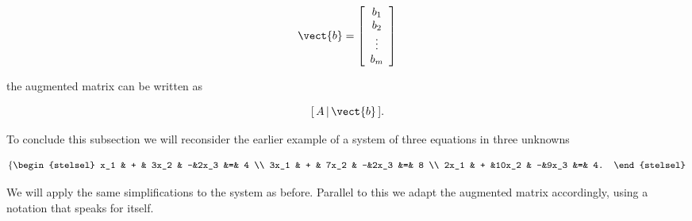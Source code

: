 $$

  \vect{b} =  \left[
\begin{array}{c}
                b_1\\b_2\\\vdots\\b_m
          \end{array}
   \right]
$$

the augmented matrix can be written as

$$

  [\,A\,|\,\vect{b}\,].
$$


\medskip

To conclude this subsection we will reconsider the earlier example of a system of three equations in three unknowns

$$

    \left\{
\begin{stelsel}
             x_1 & + & 3x_2 & -&2x_3 &=&  4 \\
            3x_1 & + & 7x_2 & -&2x_3 &=&  8 \\
            2x_1 & + &10x_2 & -&9x_3 &=& 4.
          \end{stelsel}
   \right.
$$


We will apply the same  simplifications to the system as before. Parallel to this we adapt the augmented matrix accordingly, using a notation that speaks for itself.


